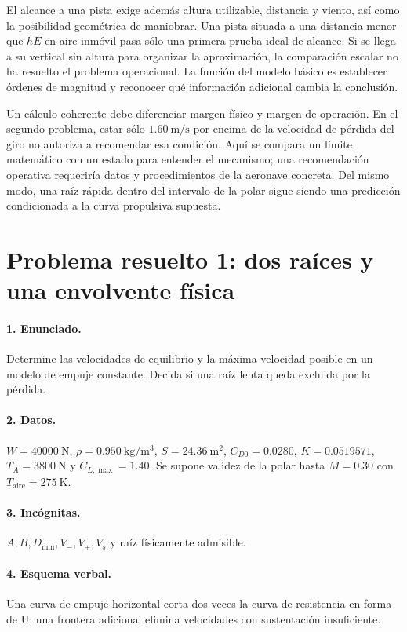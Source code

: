 El alcance a una pista exige además altura utilizable, distancia y viento, así como la posibilidad geométrica de maniobrar. Una pista situada a una distancia menor que $hE$ en aire inmóvil pasa sólo una primera prueba ideal de alcance. Si se llega a su vertical sin altura para organizar la aproximación, la comparación escalar no ha resuelto el problema operacional. La función del modelo básico es establecer órdenes de magnitud y reconocer qué información adicional cambia la conclusión.

Un cálculo coherente debe diferenciar margen físico y margen de operación. En el segundo problema, estar sólo $1.60\ \mathrm{m/s}$ por encima de la velocidad de pérdida del giro no autoriza a recomendar esa condición. Aquí se compara un límite matemático con un estado para entender el mecanismo; una recomendación operativa requeriría datos y procedimientos de la aeronave concreta. Del mismo modo, una raíz rápida dentro del intervalo de la polar sigue siendo una predicción condicionada a la curva propulsiva supuesta.

\section{Problema resuelto 1: dos raíces y una envolvente física}
\paragraph{1. Enunciado.} Determine las velocidades de equilibrio y la máxima velocidad posible en un modelo de empuje constante. Decida si una raíz lenta queda excluida por la pérdida.
\paragraph{2. Datos.} $W=40000\ \mathrm N$, $\rho=0.950\ \mathrm{kg/m^3}$, $S=24.36\ \mathrm{m^2}$, $C_{D0}=0.0280$, $K=0.0519571$, $T_A=3800\ \mathrm N$ y $C_{L,\max}=1.40$. Se supone validez de la polar hasta $M=0.30$ con $T_{\mathrm{aire}}=275\ \mathrm K$.
\paragraph{3. Incógnitas.} $A,B,D_{\min},V_-,V_+,V_s$ y raíz físicamente admisible.
\paragraph{4. Esquema verbal.} Una curva de empuje horizontal corta dos veces la curva de resistencia en forma de U; una frontera adicional elimina velocidades con sustentación insuficiente.
